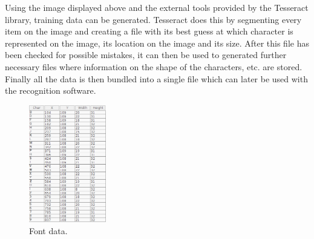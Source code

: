 Using the image displayed above and the external tools provided by the Tesseract library, training data can be generated. Tesseract does this by segmenting every item on the image and creating a file with its best guess at which character is represented on the image, its location on the image and its size. After this file has been checked for possible mistakes, it can then be used to generated further necessary files where information on the shape of the characters, etc. are stored. Finally all the data is then bundled into a single file which can later be used with the recognition software.

\begin{figure}[ht]
    \centering
    \includegraphics[width=0.3\textwidth]{plaatjes/text-data}
    \caption{Font data.}
    \label{fig:plate-font}
\end{figure}%